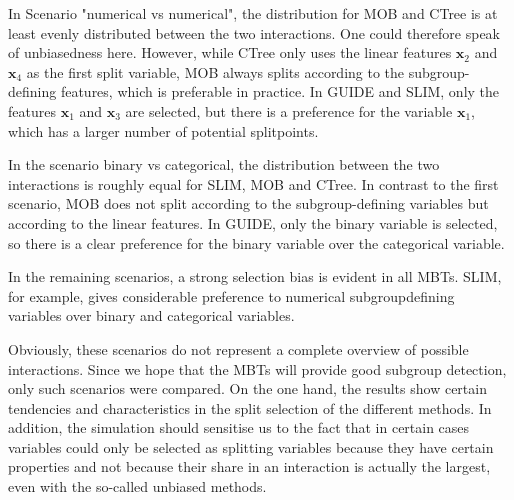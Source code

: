 In Scenario "numerical vs numerical", the distribution for MOB and CTree is at least evenly distributed between the two interactions. One could therefore speak of unbiasedness here. However, while CTree only uses the linear features $\textbf{x}_2$ and $\textbf{x}_4$ as the first split variable, MOB always splits according to the subgroup-defining features, which is preferable in practice.
In GUIDE and SLIM, only the features $\textbf{x}_1$ and $\textbf{x}_3$ are selected, but there is a preference for the variable $\textbf{x}_1$, which has a larger number of potential splitpoints.


In the scenario binary vs categorical, the distribution between the two interactions is roughly equal for SLIM, MOB and CTree. In contrast to the first scenario, MOB does not split according to the subgroup-defining variables but according to the linear features.
In GUIDE, only the binary variable is selected, so there is a clear preference for the binary variable over the categorical variable.

In the remaining scenarios, a strong selection bias is evident in all MBTs. SLIM, for example, gives considerable preference to numerical subgroupdefining variables over binary and categorical variables.





Obviously, these scenarios do not represent a complete overview of possible interactions. Since we hope that the MBTs will provide good subgroup detection, only such scenarios were compared. On the one hand, the results show certain tendencies and characteristics in the split selection of the different methods. In addition, the simulation should sensitise us to the fact that in certain cases variables could only be selected as splitting variables because they have certain properties and not because their share in an interaction is actually the largest, even with the so-called unbiased methods.












